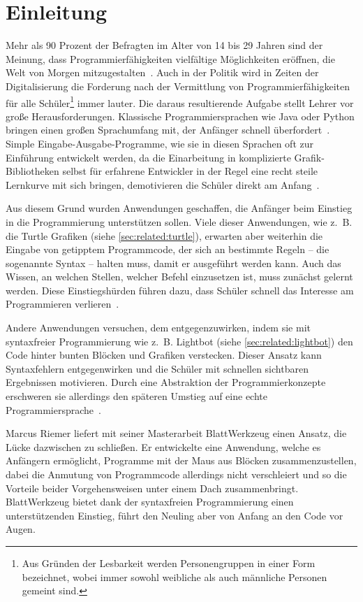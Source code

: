 \chapter{Einleitung}
\label{sec:intro}

Mehr als 90 Prozent der Befragten im Alter von 14 bis 29 Jahren sind der Meinung, dass Programmierfähigkeiten vielfältige Möglichkeiten eröffnen, die Welt von Morgen mitzugestalten~\cite{statista-1}. Auch in der Politik wird in Zeiten der Digitalisierung die Forderung nach der Vermittlung von Programmierfähigkeiten für alle Schüler\footnote{Aus Gründen der Lesbarkeit werden Personengruppen in einer Form bezeichnet, wobei immer sowohl weibliche als auch männliche Personen gemeint sind.} immer lauter. Die daraus resultierende Aufgabe stellt Lehrer vor große Herausforderungen. Klassische Programmiersprachen wie Java oder Python bringen einen großen Sprachumfang mit, der Anfänger schnell überfordert~\cite{ko2004}. Simple Eingabe-Ausgabe-Programme, wie sie in diesen Sprachen oft zur Einführung entwickelt werden, da die Einarbeitung in komplizierte Grafik-Bibliotheken selbst für erfahrene Entwickler in der Regel eine recht steile Lernkurve mit sich bringen, demotivieren die Schüler direkt am Anfang~\cite[63]{resnick2009}.

Aus diesem Grund wurden Anwendungen geschaffen, die Anfänger beim Einstieg in die Programmierung unterstützen sollen. Viele dieser Anwendungen, wie z.~B. die Turtle Grafiken (siehe \ref{sec:related:turtle}), erwarten aber weiterhin die Eingabe von getipptem Programmcode, der sich an bestimmte Regeln -- die sogenannte Syntax -- halten muss, damit er ausgeführt werden kann. Auch das Wissen, an welchen Stellen, welcher Befehl einzusetzen ist, muss zunächst gelernt werden. Diese Einstiegshürden führen dazu, dass Schüler schnell das Interesse am Programmieren verlieren~\cite{ko2004}.

Andere Anwendungen versuchen, dem entgegenzuwirken, indem sie mit syntaxfreier Programmierung wie z.~B. Lightbot (siehe \ref{sec:related:lightbot}) den Code hinter bunten Blöcken und Grafiken verstecken. Dieser Ansatz kann Syntaxfehlern entgegenwirken und die Schüler mit schnellen sichtbaren Ergebnissen motivieren. Durch eine Abstraktion der Programmierkonzepte erschweren sie allerdings den späteren Umstieg auf eine echte Programmiersprache~\cite{gouws2013}.

Marcus Riemer liefert mit seiner Masterarbeit BlattWerkzeug einen Ansatz, die Lücke dazwischen zu schließen. Er entwickelte eine Anwendung, welche es Anfängern ermöglicht, Programme mit der Maus aus Blöcken zusammenzustellen, dabei die Anmutung von Programmcode allerdings nicht verschleiert und so die Vorteile beider Vorgehensweisen unter einem Dach zusammenbringt. BlattWerkzeug bietet dank der syntaxfreien Programmierung einen unterstützenden Einstieg, führt den Neuling aber von Anfang an den Code vor Augen.

